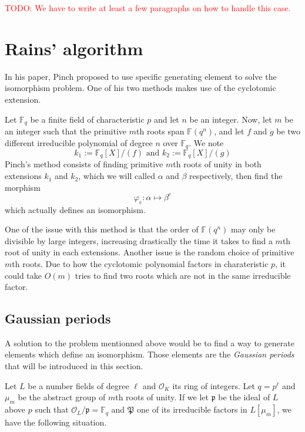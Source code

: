 \documentclass[12pt]{article}
\theoremstyle{plain}
\theoremstyle{definition}
\newcommand{\todo}[1]{\textcolor{red}{TODO: #1}}
\def\F{\ensuremath{\mathbb{F}}}
\newcounter{algorithm}
\begin{document}
\todo{We have to write at least a few paragraphs on how to handle this case.}


\section{Rains' algorithm}

In his paper, Pinch \cite{} proposed to use specific generating element to solve
the isomorphism problem. One of his two methods makes use of the cyclotomic
extension.\par
Let $\F_q$ be a finite field of characteristic $p$ and let $n$ be an integer. 
Now, let $m$ be an integer such that the primitive $m$th roots span 
$\F(q^n)$, and let $f$ and $g$ be two different irreducible polynomial of
degree $n$ over $\F_q$. We note
\begin{equation}
k_1 := \F_q[X]/(f)\text{ and }k_2 := \F_q[X]/(g)
\end{equation}
Pinch's method consists of finding primitive $m$th roots of unity in both extensions
$k_1$ and $k_2$, which we will called $\alpha$ and $\beta$ respectively, then
find the morphism
\begin{equation}
\varphi_e : \alpha\longmapsto\beta^e
\end{equation}
which actually defines an isomorphism.\par
One of the issue with this method is that the order of $\F(q^n)$ may only be
divisible by large integers, increasing drastically the time it takes to find a 
$m$th root of unity in each extensions. Another issue is the random choice of
primitive $m$th roots. Due to how the cyclotomic polynomial factors in
charateristic $p$, it could take $O(m)$ tries to find two roots which are not in
the same irreducible factor.\par

\subsection{Gaussian periods}

A solution to the problem mentionned above would be to find a way to generate
elements which define an isomorphism. Those elements are the \emph{Gaussian
periods} that will be introduced in this section.\par
Let $L$ be a number fields of degree $\ell$ and $\mathcal{O}_{K}$ its ring of
integers. Let $q = p^{\ell}$ and $\mu_m$ be the abstract group of $m$th roots of
unity. If we let $\mathfrak{p}$ be the ideal of $L$ above $p$ such that
$\mathcal{O}_L/\mathfrak{p} = \F_q$ and $\mathfrak{P}$ one of its irreducible 
factors in $L[\mu_m]$, we have the following situation.
\end{document}

